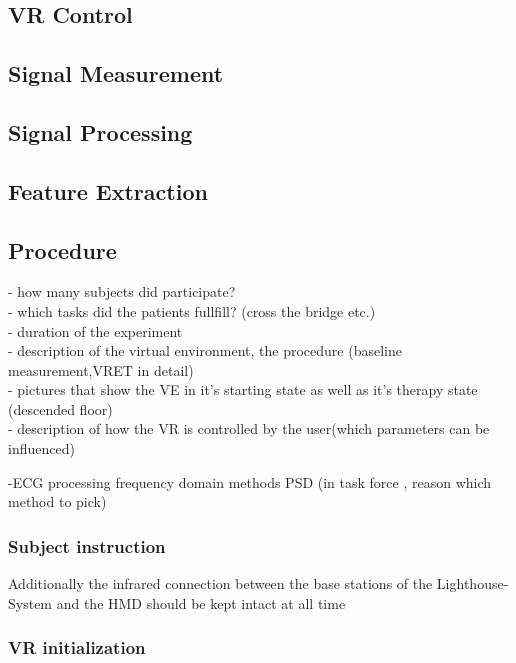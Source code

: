 \subsection{VR Control}\label{VRControl}
\subsection{Signal Measurement}
\subsection{Signal Processing}
\subsection{Feature Extraction}
\subsection{Procedure}
- how many subjects did participate?\\
- which tasks did the patients fullfill? (cross the bridge etc.)\\
- duration of the experiment\\

- description of the virtual environment, the procedure (baseline measurement,VRET in detail)\\ 
- pictures that show the VE in it's starting state as well as it's therapy state (descended floor)\\
- description of how the VR is controlled by the user(which parameters can be influenced)


-ECG processing frequency domain methods PSD (in task force , reason which method to pick)

\subsubsection{Subject instruction}
Additionally the infrared connection between the base stations of the Lighthouse-System and the HMD should be kept intact at all time
\subsubsection{VR initialization}
